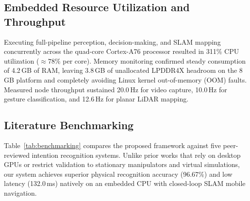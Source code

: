 \documentclass[journal]{IEEEtran}
\begin{document}
\subsection{Embedded Resource Utilization and Throughput}
Executing full-pipeline perception, decision-making, and SLAM mapping concurrently across the quad-core Cortex-A76 processor resulted in 311\% CPU utilization ($\approx 78\%$ per core). Memory monitoring confirmed steady consumption of 4.2\,GB of RAM, leaving 3.8\,GB of unallocated LPDDR4X headroom on the 8\,GB platform and completely avoiding Linux kernel out-of-memory (OOM) faults. Measured node throughput sustained 20.0\,Hz for video capture, 10.0\,Hz for gesture classification, and 12.6\,Hz for planar LiDAR mapping.

\subsection{Literature Benchmarking}
Table~\ref{tab:benchmarking} compares the proposed framework against five peer-reviewed intention recognition systems. Unlike prior works that rely on desktop GPUs or restrict validation to stationary manipulators and virtual simulations, our system achieves superior physical recognition accuracy (96.67\%) and low latency (132.0\,ms) natively on an embedded CPU with closed-loop SLAM mobile navigation.

\begin{table}[t]
\centering
\caption{Comparative Benchmarking Against Prior Intention Frameworks}
\label{tab:benchmarking}
\end{table}
\end{document}
